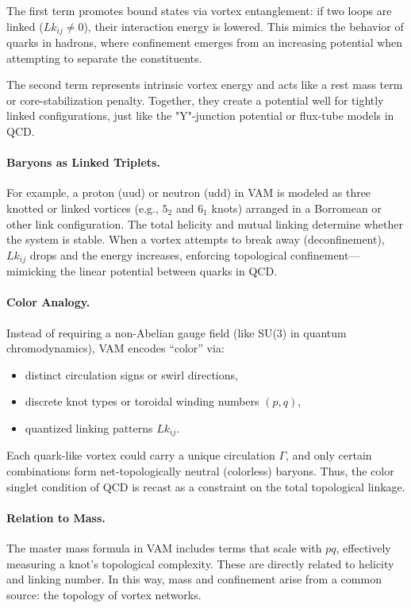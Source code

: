\documentclass[a4paper,12pt]{article}
\begin{document}
The first term promotes bound states via vortex entanglement: if two loops are linked (\( Lk_{ij} \neq 0 \)), their interaction energy is lowered. This mimics the behavior of quarks in hadrons, where confinement emerges from an increasing potential when attempting to separate the constituents.

The second term represents intrinsic vortex energy and acts like a rest mass term or core-stabilization penalty. Together, they create a potential well for tightly linked configurations, just like the "Y"-junction potential or flux-tube models in QCD.

\vspace{0.5em}
\paragraph{Baryons as Linked Triplets.} For example, a proton (uud) or neutron (udd) in VAM is modeled as three knotted or linked vortices (e.g., \( 5_2 \) and \( 6_1 \) knots) arranged in a Borromean or other link configuration. The total helicity and mutual linking determine whether the system is stable. When a vortex attempts to break away (deconfinement), \( Lk_{ij} \) drops and the energy increases, enforcing topological confinement—mimicking the linear potential between quarks in QCD.

\vspace{0.5em}
\paragraph{Color Analogy.} Instead of requiring a non-Abelian gauge field (like SU(3) in quantum chromodynamics), VAM encodes “color” via:
\begin{itemize}
    \item distinct circulation signs or swirl directions,
    \item discrete knot types or toroidal winding numbers \( (p, q) \),
    \item quantized linking patterns \( Lk_{ij} \).
\end{itemize}

Each quark-like vortex could carry a unique circulation \( \Gamma \), and only certain combinations form net-topologically neutral (colorless) baryons. Thus, the color singlet condition of QCD is recast as a constraint on the total topological linkage.

\vspace{0.5em}
\paragraph{Relation to Mass.} The master mass formula in VAM includes terms that scale with \( p q \), effectively measuring a knot’s topological complexity. These are directly related to helicity and linking number. In this way, mass and confinement arise from a common source: the topology of vortex networks.
\end{document}
